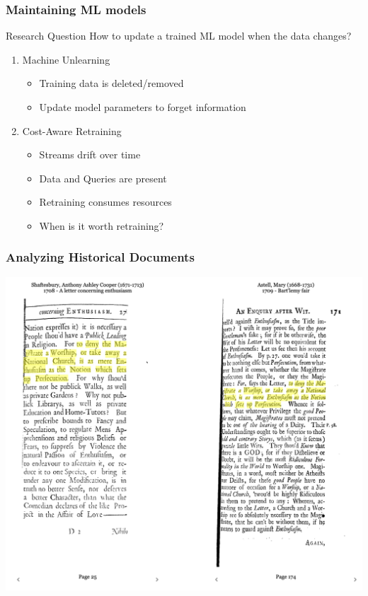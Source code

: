 \documentclass[pdf]{beamer}
\begin{document}
\begin{frame}
    \frametitle{Maintaining ML models}

    \begin{block}{\centering Research Question}
        \centering
        How to update a trained ML model when the data changes?
    \end{block}

    \begin{enumerate}
        \item Machine Unlearning 
        \begin{itemize}
            \item Training data is deleted/removed
            \item Update model parameters to forget information
        \end{itemize}
        \item Cost-Aware Retraining
        \begin{itemize}
            \item Streams drift over time
            \item Data and Queries are present
            \item Retraining consumes resources
            \item When is it worth retraining?
        \end{itemize}
    \end{enumerate}
\end{frame}


\begin{frame}
    \frametitle{Analyzing Historical Documents}
    \includegraphics[width=\textwidth]{figs/Reception-Reader-Example.png}
    

\end{frame}
\end{document}

